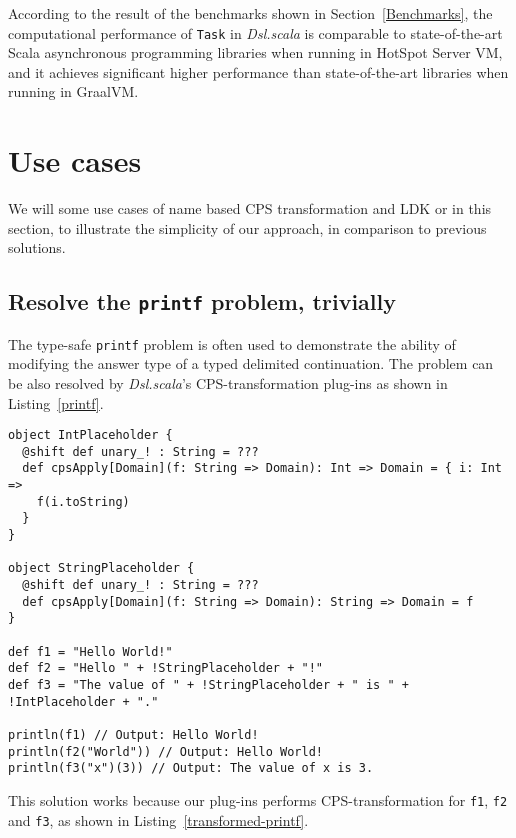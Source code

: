 \begin{description}
  According to the result of the benchmarks shown in Section~\ref{Benchmarks}, the computational performance of \lstinline{Task} in \textit{Dsl.scala} is comparable to state-of-the-art Scala asynchronous programming libraries when running in HotSpot Server VM, and it achieves significant higher performance than state-of-the-art libraries when running in GraalVM.
\end{description}

\section{Use cases}

We will some use cases of name based CPS transformation and LDK or  in this section, to illustrate the simplicity of our approach, in comparison to previous solutions.

\subsection{Resolve the \lstinline{printf} problem, trivially}\label{resolve-printf-problem}

The type-safe \lstinline{printf} problem \cite{danvy1998functional} is often used to demonstrate the ability of modifying the answer type of a typed delimited continuation. The problem can be also resolved by \textit{Dsl.scala}'s CPS-transformation plug-ins as shown in Listing~\ref{printf}.

\begin{lstlisting}[caption={A solution of the type-safe \lstinline{printf} problem in \textit{Dsl.scala}},label={printf}]
object IntPlaceholder {
  @shift def unary_! : String = ???
  def cpsApply[Domain](f: String => Domain): Int => Domain = { i: Int =>
    f(i.toString)
  }
}

object StringPlaceholder {
  @shift def unary_! : String = ???
  def cpsApply[Domain](f: String => Domain): String => Domain = f
}

def f1 = "Hello World!"
def f2 = "Hello " + !StringPlaceholder + "!"
def f3 = "The value of " + !StringPlaceholder + " is " + !IntPlaceholder + "."

println(f1) // Output: Hello World!
println(f2("World")) // Output: Hello World!
println(f3("x")(3)) // Output: The value of x is 3.
\end{lstlisting}

This solution works because our plug-ins performs CPS-transformation for \lstinline{f1}, \lstinline{f2} and \lstinline{f3}, as shown in Listing~\ref{transformed-printf}.

